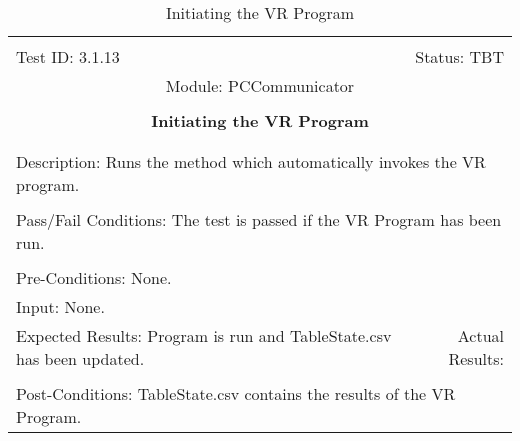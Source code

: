 \documentclass[titlepage]{article}
\begin{document}
\begin{center}%
\begin{table}
\begin{tabular}{|l r|}\hline&\\[-2mm]
	Test ID: 3.1.13	&Status: TBT\\[-3mm]
	\multicolumn{2}{|c|}{Module: PCCommunicator}\\&\\
	\multicolumn{2}{|c|}{\textbf{\large{Initiating the VR Program}}}\\&\\\hline&\\[-3mm]
	\multicolumn{2}{|p{\textwidth}|}{Description: Runs the method which automatically invokes the VR program.}\\[1mm]\hline&\\[-3mm]
	\multicolumn{2}{|p{\textwidth}|}{Pass/Fail Conditions: The test is passed if the VR Program has been run.}\\[1mm]\hline&\\[-3mm]
	\multicolumn{2}{|p{\textwidth}|}{Pre-Conditions: None.}\\[4mm]
	\multicolumn{2}{|p{\textwidth}|}{Input: None.}\\[2mm]\hline
	\multicolumn{1}{|p{0.49\textwidth}}{Expected Results: Program is run and TableState.csv has been updated.}	&\multicolumn{1}{|p{0.45\textwidth}|}{Actual Results: }\\\hline&\\[-3mm]
	\multicolumn{2}{|p{\textwidth}|}{Post-Conditions: TableState.csv contains the results of the VR Program.}\\\hline
\end{tabular}
\caption{Initiating the VR Program}
\end{table}
\end{center}
\end{document}
